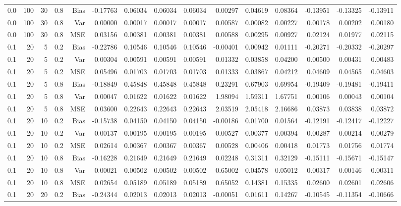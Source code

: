 \begin{table}[!htbp]
\begin{tabular}{lrrrrrrrrrrrrrr}
0.0 & 100 & 30 & 0.8 & Bias & -0.17763 & 0.06034 & 0.06034 & 0.06034 & 0.00297 & 0.04619 & 0.08364 & -0.13951 & -0.13325 & -0.13911 \\
0.0 & 100 & 30 & 0.8 & Var & 0.00000 & 0.00017 & 0.00017 & 0.00017 & 0.00587 & 0.00082 & 0.00227 & 0.00178 & 0.00202 & 0.00180 \\
0.0 & 100 & 30 & 0.8 & MSE & 0.03156 & 0.00381 & 0.00381 & 0.00381 & 0.00588 & 0.00295 & 0.00927 & 0.02124 & 0.01977 & 0.02115 \\
0.1 &  20 &  5 & 0.2 & Bias & -0.22786 & 0.10546 & 0.10546 & 0.10546 & -0.00401 & 0.00942 & 0.01111 & -0.20271 & -0.20332 & -0.20297 \\
0.1 &  20 &  5 & 0.2 & Var & 0.00304 & 0.00591 & 0.00591 & 0.00591 & 0.01332 & 0.03858 & 0.04200 & 0.00500 & 0.00431 & 0.00483 \\
0.1 &  20 &  5 & 0.2 & MSE & 0.05496 & 0.01703 & 0.01703 & 0.01703 & 0.01333 & 0.03867 & 0.04212 & 0.04609 & 0.04565 & 0.04603 \\
0.1 &  20 &  5 & 0.8 & Bias & -0.18849 & 0.45848 & 0.45848 & 0.45848 & 0.23291 & 0.67903 & 0.69954 & -0.19409 & -0.19481 & -0.19411 \\
0.1 &  20 &  5 & 0.8 & Var & 0.00047 & 0.01622 & 0.01622 & 0.01622 & 1.98094 & 1.59311 & 1.67751 & 0.00106 & 0.00043 & 0.00104 \\
0.1 &  20 &  5 & 0.8 & MSE & 0.03600 & 0.22643 & 0.22643 & 0.22643 & 2.03519 & 2.05418 & 2.16686 & 0.03873 & 0.03838 & 0.03872 \\
0.1 &  20 & 10 & 0.2 & Bias & -0.15738 & 0.04150 & 0.04150 & 0.04150 & -0.00186 & 0.01700 & 0.01564 & -0.12191 & -0.12417 & -0.12227 \\
0.1 &  20 & 10 & 0.2 & Var & 0.00137 & 0.00195 & 0.00195 & 0.00195 & 0.00527 & 0.00377 & 0.00394 & 0.00287 & 0.00214 & 0.00279 \\
0.1 &  20 & 10 & 0.2 & MSE & 0.02614 & 0.00367 & 0.00367 & 0.00367 & 0.00528 & 0.00406 & 0.00418 & 0.01773 & 0.01756 & 0.01774 \\
0.1 &  20 & 10 & 0.8 & Bias & -0.16228 & 0.21649 & 0.21649 & 0.21649 & 0.02248 & 0.31311 & 0.32129 & -0.15111 & -0.15671 & -0.15147 \\
0.1 &  20 & 10 & 0.8 & Var & 0.00021 & 0.00502 & 0.00502 & 0.00502 & 0.65002 & 0.04578 & 0.05012 & 0.00317 & 0.00146 & 0.00311 \\
0.1 &  20 & 10 & 0.8 & MSE & 0.02654 & 0.05189 & 0.05189 & 0.05189 & 0.65052 & 0.14381 & 0.15335 & 0.02600 & 0.02601 & 0.02606 \\
0.1 &  20 & 20 & 0.2 & Bias & -0.24344 & 0.02013 & 0.02013 & 0.02013 & -0.00051 & 0.01611 & 0.14267 & -0.10545 & -0.11354 & -0.10666 \\

\end{tabular}
\end{table}
